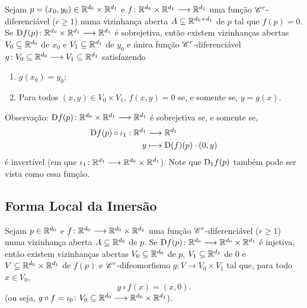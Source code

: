 \begin{prop}

Sejam $p=(x_0,y_0) \in \mathbb{R}^{d_0} \times \mathbb{R}^{d_1}$ e $f\colon \mathbb{R}^{d_0} \times \mathbb{R}^{d_1} \longrightarrow \mathbb{R}^{d_1}$ uma função $\mathscr{C}^r$-diferenciável ($r \geq 1$) numa vizinhança aberta $A \subseteq \mathbb{R}^{d_0+d_1}$ de $p$ tal que $f(p)=0$.
Se $\mathrm{D} f(p)\colon \mathbb{R}^{d_0} \times \mathbb{R}^{d_1} \longrightarrow \mathbb{R}^{d_1}$ é sobrejetiva, então existem vizinhanças abertas $V_0 \subseteq \mathbb{R}^{d_0}$ de $x_0$ e $V_1 \subseteq \mathbb{R}^{d_1}$ de $y_0$ e única função $\mathscr{C}^r$-diferenciável $g\colon V_0 \subseteq \mathbb{R}^{d_0} \longrightarrow V_1 \subseteq \mathbb{R}^{d_1}$ satisfazendo
	\begin{enumerate}
	\item $g(x_0)=y_0$;
	\item Para todos $(x,y) \in V_0 \times V_1$, $f(x,y)=0$ se, e somente se, $y=g(x)$.
	\end{enumerate}
\end{prop}

Observação: $\mathrm{D} f(p)\colon \mathbb{R}^{d_0} \times \mathbb{R}^{d_1} \longrightarrow \mathbb{R}^{d_1}$ é sobrejetiva se, e somente se,
	\begin{align*}
	{\mathrm{D}f(p) \circ \iota_1}: {\mathbb{R}^{d_1}} &\longrightarrow {\mathbb{R}^{d_1}} \\{y} &\longmapsto {\mathrm{D}(f)(p) \cdot (0,y)}
	\end{align*}
é invertível (em que $\iota_1\colon \mathbb{R}^{d_1} \longrightarrow \mathbb{R}^{d_0} \times \mathbb{R}^{d_1}$).  Note que $\mathrm{D}_1 f(p)$ também pode ser vista como essa função.

\subsection{Forma Local da Imersão}

\begin{prop}

Sejam $p \in \mathbb{R}^{d_0}$ e $f\colon \mathbb{R}^{d_0} \longrightarrow \mathbb{R}^{d_0} \times \mathbb{R}^{d_1}$ uma função $\mathscr{C}^r$-diferenciável ($r \geq 1$) numa vizinhança aberta $A \subseteq \mathbb{R}^{d_0}$ de $p$. Se $\mathrm{D} f(p) \colon \mathbb{R}^{d_0} \longrightarrow \mathbb{R}^{d_0} \times \mathbb{R}^{d_1}$ é injetiva, então existem vizinhanças abertas $V_0 \subseteq \mathbb{R}^{d_0}$ de $p$, $V_1 \subseteq \mathbb{R}^{d_1}$ de $0$ e $V \subseteq \mathbb{R}^{d_0} \times \mathbb{R}^{d_1}$ de $f(p)$ e $\mathscr{C}^r$-difeomorfismo $g\colon V \to V_0 \times V_1$ tal que, para todo $x \in V_0$,
	\begin{equation*}
	g \circ f(x)=(x,0).
	\end{equation*}
(ou seja, $g \circ f = \iota_0\colon V_0 \subseteq \mathbb{R}^{d_0} \longrightarrow \mathbb{R}^{d_0} \times \mathbb{R}^{d_1}$).
\end{prop}

